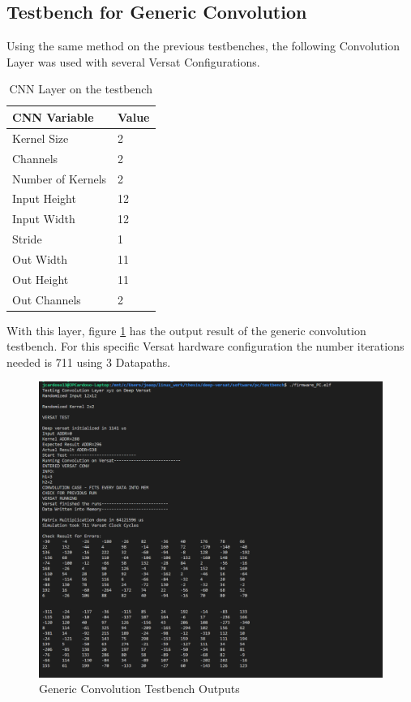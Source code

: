 \subsection{Testbench for Generic Convolution}

Using the same method on the previous testbenches, the following Convolution Layer was used
with several Versat Configurations.

\begin{table}[!htpb]
    \centering
    \begin{tabular}{ll}
    \hline
    \textbf{CNN Variable} & \textbf{Value}        \\ \hline
    Kernel Size            & 2                 \\
    Channels            & 2                       \\
    Number of Kernels            & 2                       \\
    Input Height                  & 12                        \\
    Input Width                & 12                  \\
    Stride              & 1                     \\
    Out Width               & 11                      \\
    Out Height            & 11  \\
    Out Channels                   & 2                     \\ \hline
    \end{tabular}
    \label{table:convInput}
    \caption{CNN Layer on the testbench}
\end{table}

With this layer, figure \ref{figure:test3} has the output result of the generic convolution testbench.
For this specific Versat hardware configuration the number iterations needed is 711 using 3 Datapaths.

\begin{figure}[!htbp]
    \centering
    \includegraphics[width=\textwidth]{Figures/test3.png}
    \caption{Generic Convolution Testbench Outputs}
    \label{figure:test3}
\end{figure}

